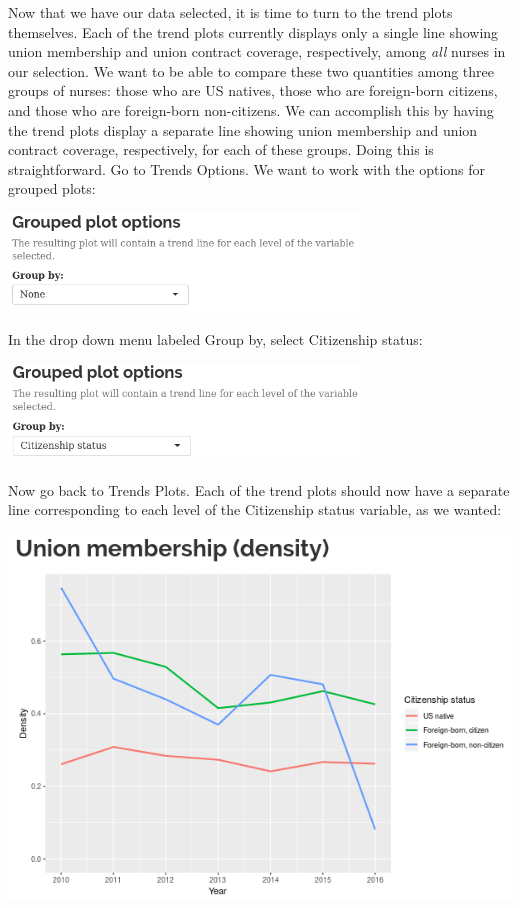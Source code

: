 \documentclass[letterpaper,12pt]{article}
\begin{document}
\begin{enumerate}
  Now that we have our data selected, it is time to turn to the trend
  plots themselves. Each of the trend plots currently displays only a
  single line showing union membership and union contract coverage,
  respectively, among \emph{all} nurses in our selection. We want to
  be able to compare these two quantities among three groups of
  nurses: those who are US natives, those who are foreign-born
  citizens, and those who are foreign-born non-citizens. We can
  accomplish this by having the trend plots display a separate line
  showing union membership and union contract coverage, respectively,
  for each of these groups. Doing this is straightforward. Go to
  Trends \textrightarrow{} Options. We want to work with the options
  for grouped plots:
  \begin{center}
    \includegraphics[width=0.7\textwidth]{images/trends_ex3/grouped_plot_options.png}
  \end{center}
  In the drop down menu labeled Group by, select Citizenship status:
  \begin{center}
    \includegraphics[width=0.7\textwidth]{images/trends_ex3/grouped_plot_options2.png}
  \end{center}
  Now go back to Trends \textrightarrow{} Plots. Each of the trend
  plots should now have a separate line corresponding to each level of
  the Citizenship status variable, as we wanted:
  \begin{center}
    \includegraphics[width=0.49\linewidth]{images/trends_ex3/membership_trend.png}

\end{center}
\end{enumerate}
\end{document}
